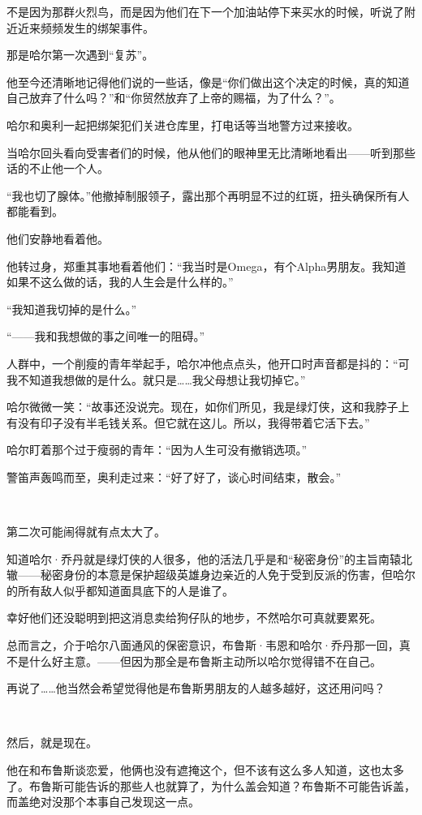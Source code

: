 \documentclass[../main]{subfiles}
\begin{document}
不是因为那群火烈鸟，而是因为他们在下一个加油站停下来买水的时候，听说了附近近来频频发生的绑架事件。

那是哈尔第一次遇到“复苏”。

他至今还清晰地记得他们说的一些话，像是“你们做出这个决定的时候，真的知道自己放弃了什么吗？”和“你贸然放弃了上帝的赐福，为了什么？”。

哈尔和奥利一起把绑架犯们关进仓库里，打电话等当地警方过来接收。

当哈尔回头看向受害者们的时候，他从他们的眼神里无比清晰地看出——听到那些话的不止他一个人。

“我也切了腺体。”他撤掉制服领子，露出那个再明显不过的红斑，扭头确保所有人都能看到。

他们安静地看着他。

他转过身，郑重其事地看着他们：“我当时是Omega，有个Alpha男朋友。我知道如果不这么做的话，我的人生会是什么样的。”

“我知道我切掉的是什么。”

“——我和我想做的事之间唯一的阻碍。”

人群中，一个削瘦的青年举起手，哈尔冲他点点头，他开口时声音都是抖的：“可我不知道我想做的是什么。就只是……我父母想让我切掉它。”

哈尔微微一笑：“故事还没说完。现在，如你们所见，我是绿灯侠，这和我脖子上有没有印子没有半毛钱关系。但它就在这儿。所以，我得带着它活下去。”

哈尔盯着那个过于瘦弱的青年：“因为人生可没有撤销选项。”

警笛声轰鸣而至，奥利走过来：“好了好了，谈心时间结束，散会。”

~\

第二次可能闹得就有点太大了。

知道哈尔·乔丹就是绿灯侠的人很多，他的活法几乎是和“秘密身份”的主旨南辕北辙——秘密身份的本意是保护超级英雄身边亲近的人免于受到反派的伤害，但哈尔的所有敌人似乎都知道面具底下的人是谁了。

幸好他们还没聪明到把这消息卖给狗仔队的地步，不然哈尔可真就要累死。

总而言之，介于哈尔八面通风的保密意识，布鲁斯·韦恩和哈尔·乔丹那一回，真不是什么好主意。——但因为那全是布鲁斯主动所以哈尔觉得错不在自己。

再说了……他当然会希望觉得他是布鲁斯男朋友的人越多越好，这还用问吗？

~\

然后，就是现在。

他在和布鲁斯谈恋爱，他俩也没有遮掩这个，但不该有这么多人知道，这也太多了。布鲁斯可能告诉的那些人也就算了，为什么盖会知道？布鲁斯不可能告诉盖，而盖绝对没那个本事自己发现这一点。
\end{document}
